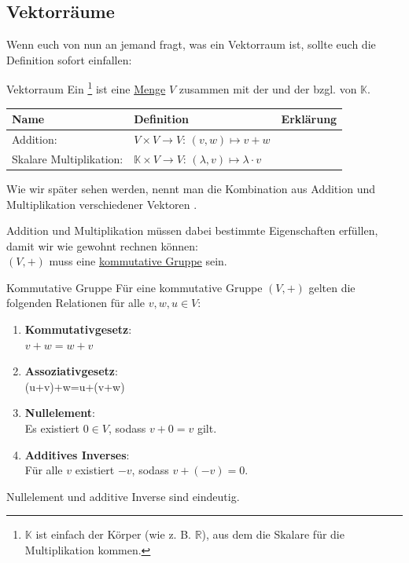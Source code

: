 \subsection{Vektorräume}\label{ssec:Vektorraum}
Wenn euch von nun an jemand fragt, was ein Vektorraum ist, sollte euch die Definition sofort einfallen:
\begin{Def}
{Vektorraum}
Ein \footnote{$\mathbb{K}$ ist einfach der Körper (wie z. B. $\mathbb{R}$), aus dem die Skalare für die Multiplikation kommen.} ist eine \underline{Menge} $V$ zusammen mit der  und der  bzgl. von $\mathbb{K}$.\\
\begin{tabular}{l|l|l}
    \textbf{Name} &\textbf{ Definition }&\textbf{ Erklärung} \\
    \hline
    Addition: & $V\times V\to V:\, (v,w)\mapsto v+w$ &\parbox[t]{5cm}{} \\
    Skalare Multiplikation: & $\mathbb{K}\times V\to V:\,(\lambda, v)\mapsto \lambda \cdot v$ & \parbox[t]{5cm}{}
\end{tabular}
Wie wir später sehen werden, nennt man die Kombination aus Addition und Multiplikation verschiedener Vektoren .
\end{Def}
Addition und Multiplikation müssen dabei bestimmte Eigenschaften erfüllen, damit wir wie gewohnt rechnen können:\\
$(V,+)$ muss eine \underline{kommutative Gruppe} sein.
\begin{Def}
{Kommutative Gruppe}
Für eine kommutative Gruppe $(V,+)$ gelten die folgenden Relationen für alle $v,w,u\in V$:
\begin{enumerate}
    \item \textbf{Kommutativgesetz}:\\
    $v+w=w+v$
    \item \textbf{Assoziativgesetz}:\\
    (u+v)+w=u+(v+w)
    \item \textbf{Nullelement}:\\
    Es existiert $0\in V$, sodass $v+0=v$ gilt.
    \item \textbf{Additives Inverses}:\\
    Für alle $v$ existiert $-v$, sodass $v+(-v)=0$.
\end{enumerate}
Nullelement und additive Inverse sind eindeutig.
\end{Def}
